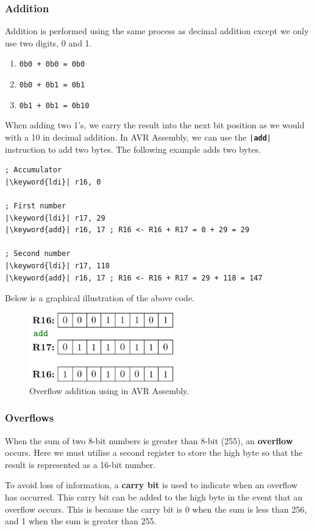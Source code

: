 \documentclass{article}
\newcommand{\keyword}[1]{\textcolor[rgb]{0.00,0.50,0.00}{\textbf{#1}}}
\begin{document}
\subsubsection{Addition}
Addition is performed using the same process as decimal addition except we only use two digits, 0 and 1.
\begin{enumerate}
    \item \texttt{0b0 + 0b0 = 0b0}
    \item \texttt{0b0 + 0b1 = 0b1}
    \item \texttt{0b1 + 0b1 = 0b10}
\end{enumerate}
When adding two 1's, we carry the result into the next bit position as we would with a 10 in decimal addition.
In AVR Assembly, we can use the \texttt{|\keyword{add}|} instruction to add two bytes. The following
example adds two bytes.
\begin{verbatim}
; Accumulator
|\keyword{ldi}| r16, 0

; First number
|\keyword{ldi}| r17, 29
|\keyword{add}| r16, 17 ; R16 <- R16 + R17 = 0 + 29 = 29

; Second number
|\keyword{ldi}| r17, 118
|\keyword{add}| r16, 17 ; R16 <- R16 + R17 = 29 + 118 = 147
\end{verbatim}
Below is a graphical illustration of the above code.
\begin{figure}[H]
    \centering
    \includegraphics[height = 3cm, keepaspectratio = true]{figures/add.pdf}
    \caption{Overflow addition using \keyword{} in AVR Assembly.} %
\end{figure}
\subsubsection{Overflows}
When the sum of two 8-bit numbers is greater than 8-bit (255), an \textbf{overflow} occurs.
Here we must utilise a second register to store the high byte so that the result is represented as
a 16-bit number.

To avoid loss of information, a \textbf{carry bit} is used to indicate when an overflow has occurred.
This carry bit can be added to the high byte in the event that an overflow occurs.
This is because the carry bit is 0 when the sum is less than 256, and 1 when the sum is greater than 255.
\end{document}
